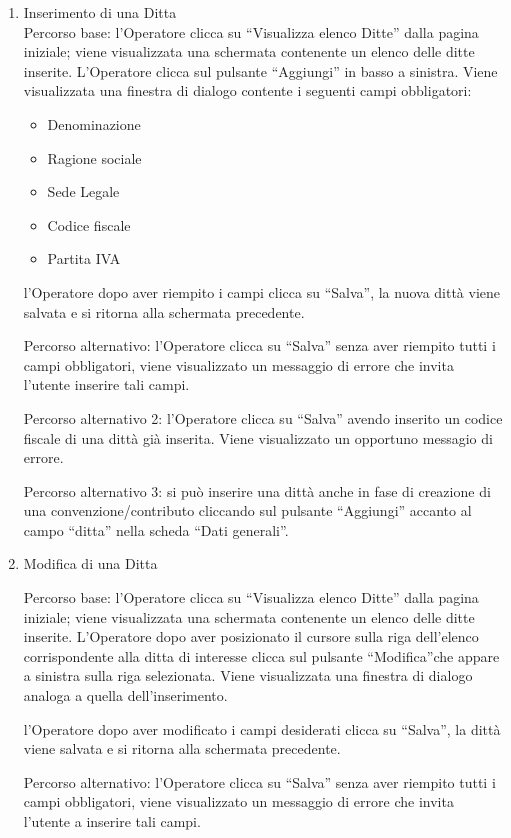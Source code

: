 \begin{enumerate}
\begin{enumerate}
\item Inserimento di una Ditta\\ \label{UC_new_company}
Percorso base:
l'Operatore clicca su ``Visualizza elenco Ditte'' dalla pagina iniziale; viene visualizzata una schermata contenente un elenco delle ditte inserite. L'Operatore clicca sul pulsante ``Aggiungi'' in basso a sinistra. Viene visualizzata
una finestra di dialogo contente i seguenti campi obbligatori:
\begin{itemize}
 \item Denominazione
 \item Ragione sociale
 \item Sede Legale
 \item Codice fiscale
 \item Partita IVA
\end{itemize}
l'Operatore dopo aver riempito i campi clicca su ``Salva'', la nuova dittà viene salvata e si ritorna alla schermata precedente.

Percorso alternativo:
l'Operatore clicca su ``Salva'' senza aver riempito tutti i campi obbligatori, viene visualizzato un messaggio di errore che invita l'utente inserire tali campi.

Percorso alternativo 2:
l'Operatore clicca su ``Salva'' avendo inserito un codice fiscale di una dittà già inserita. Viene visualizzato un opportuno messagio di errore.

Percorso alternativo 3:
si può inserire una dittà anche in fase di creazione di una convenzione/contributo cliccando sul pulsante ``Aggiungi'' accanto al campo ``ditta'' nella scheda ``Dati generali''.

\item Modifica di una Ditta\\ \label{UC_edit_company}

Percorso base:
l'Operatore clicca su ``Visualizza elenco Ditte'' dalla pagina iniziale; viene visualizzata una schermata contenente un elenco delle ditte inserite. L'Operatore dopo aver posizionato il cursore sulla riga dell'elenco
corrispondente alla ditta di interesse clicca sul pulsante ``Modifica''che appare a sinistra sulla riga selezionata. Viene visualizzata
una finestra di dialogo analoga a quella dell'inserimento.

l'Operatore dopo aver modificato i campi desiderati clicca su ``Salva'', la  dittà viene salvata e si ritorna alla schermata precedente.

Percorso alternativo:
l'Operatore clicca su ``Salva'' senza aver riempito tutti i campi obbligatori, viene visualizzato un messaggio di errore che invita l'utente a inserire tali campi.


\end{enumerate}
\end{enumerate}
